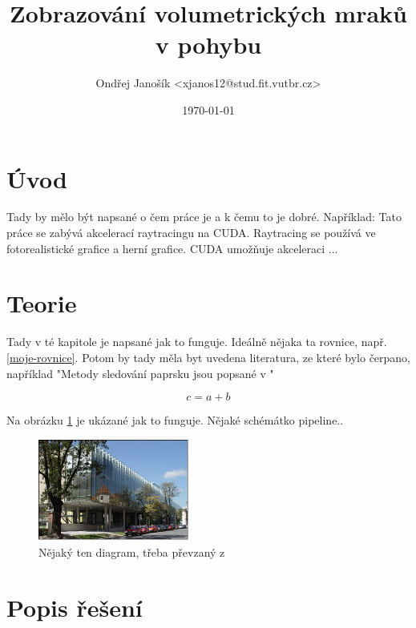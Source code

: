 \documentclass[a4paper, 12pt]{article}
\title{Zobrazování volumetrických mraků v pohybu}
\author{Ondřej Janošík <xjanos12@stud.fit.vutbr.cz>}
\date{\today}
\begin{document}
\maketitle

\section{Úvod}

Tady by mělo být napsané o čem práce je a k čemu to je dobré. Například: Tato práce se zabývá akcelerací
raytracingu na CUDA. Raytracing se používá ve fotorealistické grafice a herní grafice. CUDA umožňuje
akceleraci ...


\section{Teorie}

Tady v té kapitole je napsané jak to funguje. Ideálně nějaka ta rovnice, např. \ref{moje-rovnice}. Potom by
tady měla byt uvedena literatura, ze které bylo čerpano, například "Metody sledování paprsku jsou popsané v \cite{Cox2008} \cite{zemcik2006}"


\begin{equation}
  \label{moje-rovnice}
  c = a + b
\end{equation}

Na obrázku \ref{fig:obrazek} je ukázané jak to funguje. Nějaké schémátko pipeline..

\begin{figure}[htb]
  \centering
  \includegraphics[width=5cm,keepaspectratio]{obrazek.jpg}
  \caption{Nějaký ten diagram, třeba převzaný z \cite{wikipedia}}
  \label{fig:obrazek}
\end{figure}


\section{Popis řešení}
\end{document}
